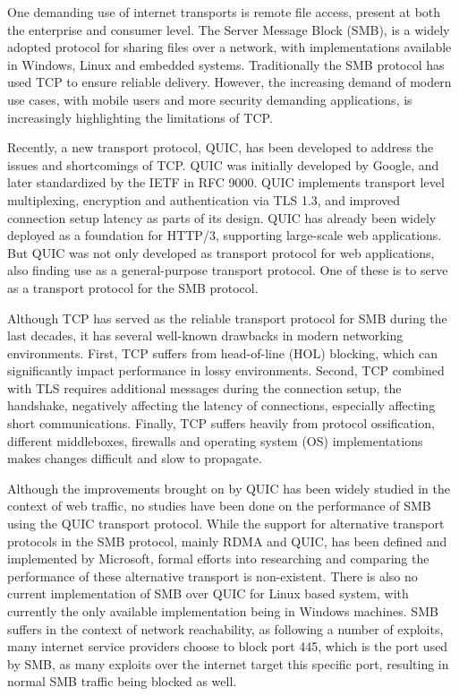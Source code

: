 \documentclass[english, 12pt, a4paper, elec, utf8, a-2b, online]{aaltothesis}
\begin{document}
One demanding use of internet transports is remote file access, present at both
the enterprise and consumer level. The Server Message Block (SMB)\cite{smb2}, is a
widely adopted protocol for sharing files over a network, with implementations available
in Windows, Linux and embedded systems. Traditionally the SMB protocol has used
TCP to ensure reliable delivery\cite{smb2}. However, the increasing demand of modern
use cases, with mobile users and more security demanding applications, is increasingly
highlighting the limitations of TCP.

Recently, a new transport protocol, QUIC, has been developed to address
the issues and shortcomings of TCP. QUIC was initially developed by Google\cite{quic_transport_protocol_design},
and later standardized by the IETF in RFC 9000\cite{rfc9000}. QUIC implements transport
level multiplexing, encryption and authentication via TLS 1.3, and improved connection
setup latency as parts of its design\cite{rfc9000,rfc9001}. QUIC has already been
widely deployed as a foundation for HTTP/3\cite{rfc9114}, supporting large-scale
web applications. But QUIC was not only developed as transport protocol for web applications,
also finding use as a general-purpose transport protocol\cite{rfc9000}. One of these is 
to serve as a transport protocol for the SMB protocol.

Although TCP has served as the reliable transport protocol for SMB during the last
decades, it has several well-known drawbacks in modern networking environments.
First, TCP suffers from head-of-line (HOL) blocking, which can significantly
impact performance in lossy environments. Second, TCP combined with TLS requires
additional messages during the connection setup, the handshake, negatively affecting
the latency of connections, especially affecting short communications. Finally,
TCP suffers heavily from protocol ossification, different middleboxes, firewalls and
operating system (OS) implementations makes changes difficult and slow to propagate\cite{quic_transport_protocol_design}.

Although the improvements brought on by QUIC has been widely studied in the context
of web traffic\cite{quic_better_for_what,evaluating_quic_perf,quic_and_tcp_performance},
no studies have been done on the performance of SMB using the QUIC transport protocol.
While the support for alternative transport protocols in the SMB protocol, mainly
RDMA and QUIC, has been defined and implemented by Microsoft\cite{smb2}, formal
efforts into researching and comparing the performance of these alternative transport
is non-existent. There is also no current implementation of SMB over QUIC for Linux
based system, with currently the only available implementation being in Windows machines.
SMB suffers in the context of network reachability, as following a number of exploits,
many internet service providers choose to block port 445, which is the port used
by SMB, as many exploits over the internet target this specific port, resulting
in normal SMB traffic being blocked as well\cite{bitag_port_blocking}.
\end{document}
